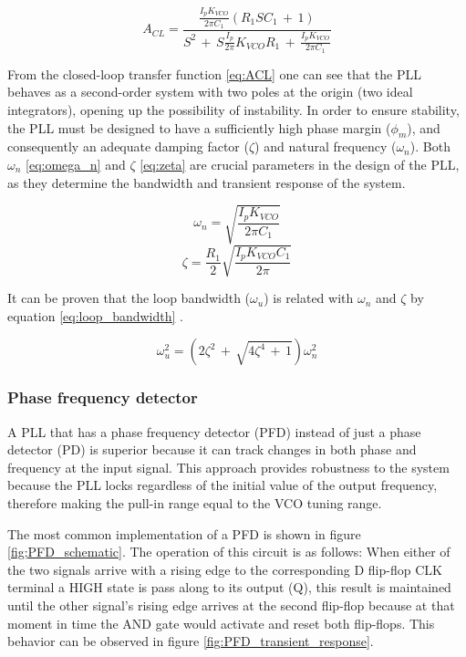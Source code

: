 \begin{equation}
    A_{CL} = \frac{\frac{I_p K_{VCO}}{2 \pi C_1} (R_1 S C_1 \, + \, 1)}{S^2 \, + \, S \frac{I_p}{2 \pi} K_{VCO} R_1 \, + \, \frac{I_p K_{VCO}}{2 \pi C_1}}
    \label{eq:ACL}
\end{equation}

\noindent From the closed-loop transfer function \eqref{eq:ACL} one can see that the PLL behaves as a second-order system with two poles at the 
origin (two ideal integrators), opening up the possibility of instability. In order to ensure stability, the PLL must be designed to have 
a sufficiently high phase margin ($\phi_m$), and consequently an adequate damping factor ($\zeta$) and natural frequency ($\omega_{n}$). 
Both $\omega_{n}$ \eqref{eq:omega_n} and $\zeta$ \eqref{eq:zeta} are crucial parameters in the design of the PLL, as they determine the bandwidth
and transient response of the system.

\begin{equation}
    \omega_{n} = \sqrt{\frac{I_p K_{VCO}}{2 \pi C_1}}
    \label{eq:omega_n}
\end{equation}
\begin{equation}
    \zeta = \frac{R_1}{2} \sqrt{\frac{I_p K_{VCO} C_1}{2 \pi}}
    \label{eq:zeta}
\end{equation}

\noindent It can be proven that the loop bandwidth ($\omega_u$) is related with $\omega_{n}$ and $\zeta$ by equation \eqref{eq:loop_bandwidth} \cite{Razavi_PLL_book}.

\begin{equation}
    \omega_{u}^2 = (2 \zeta^2 \, + \, \sqrt{4 \zeta^4 \, + \, 1}) \omega_{n}^2
    \label{eq:loop_bandwidth}
\end{equation}

\subsubsection{Phase frequency detector}

A PLL that has a phase frequency detector (PFD) instead of just a phase detector (PD) is superior because it can track changes in both
phase and frequency at the input signal. This approach provides robustness to the system because the PLL locks regardless of the initial
value of the output frequency, therefore making the pull-in range equal to the VCO tuning range.

\noindent The most common implementation of a PFD is shown in figure \ref{fig;PFD_schematic}. The operation of this circuit is as follows:
When either of the two signals arrive with a rising edge to the corresponding D flip-flop CLK terminal a HIGH state is pass along
to its output (Q), this result is maintained until the other signal's rising edge arrives at the second flip-flop because at that
moment in time the AND gate would activate and reset both flip-flops. This behavior can be observed in figure \ref{fig:PFD_transient_response}.

